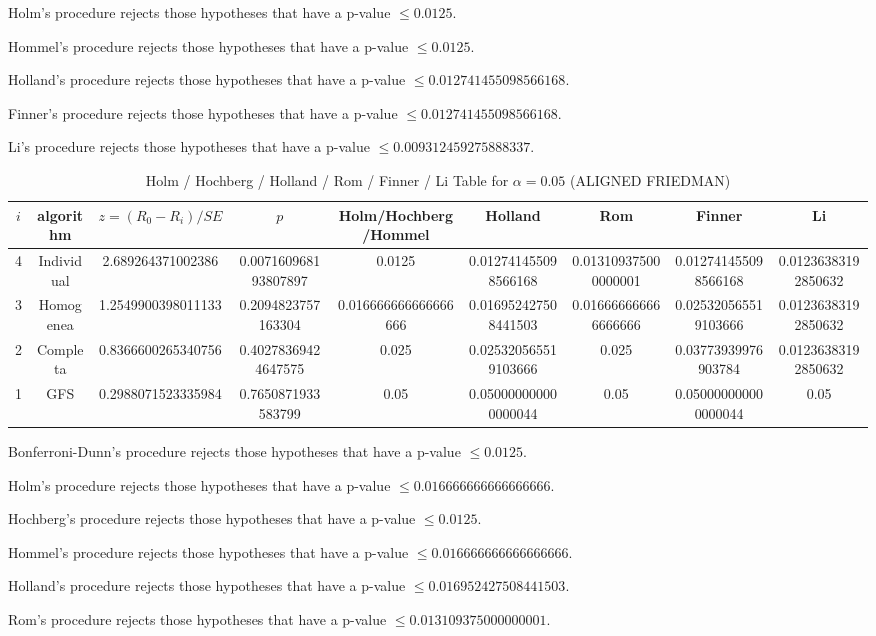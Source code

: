 \documentclass[a4paper,10pt]{article}
\begin{document}
\begin{landscape}
Holm's procedure rejects those hypotheses that have a p-value $\le0.0125$.


Hommel's procedure rejects those hypotheses that have a p-value $\le0.0125$.


Holland's procedure rejects those hypotheses that have a p-value $\le0.012741455098566168$.


Finner's procedure rejects those hypotheses that have a p-value $\le0.012741455098566168$.


Li's procedure rejects those hypotheses that have a p-value $\le0.009312459275888337$.



\newpage

\begin{table}[!htp]
\centering\scriptsize
\caption{Holm / Hochberg / Holland / Rom / Finner / Li Table for $\alpha=0.05$ (ALIGNED FRIEDMAN)}
\begin{tabular}{ccccccccc}
$i$&algorithm&$z=(R_0 - R_i)/SE$&$p$&Holm/Hochberg/Hommel&Holland&Rom&Finner&Li\\
\hline
4&Individual&2.689264371002386&0.007160968193807897&0.0125&0.012741455098566168&0.013109375000000001&0.012741455098566168&0.01236383192850632\\
3&Homogenea&1.2549900398011133&0.2094823757163304&0.016666666666666666&0.016952427508441503&0.016666666666666666&0.025320565519103666&0.01236383192850632\\
2&Completa&0.8366600265340756&0.40278369424647575&0.025&0.025320565519103666&0.025&0.03773939976903784&0.01236383192850632\\
1&GFS&0.2988071523335984&0.7650871933583799&0.05&0.050000000000000044&0.05&0.050000000000000044&0.05\\
\hline
\end{tabular}
\end{table}
Bonferroni-Dunn's procedure rejects those hypotheses that have a p-value $\le0.0125$.


Holm's procedure rejects those hypotheses that have a p-value $\le0.016666666666666666$.


Hochberg's procedure rejects those hypotheses that have a p-value $\le0.0125$.


Hommel's procedure rejects those hypotheses that have a p-value $\le0.016666666666666666$.


Holland's procedure rejects those hypotheses that have a p-value $\le0.016952427508441503$.


Rom's procedure rejects those hypotheses that have a p-value $\le0.013109375000000001$.



\end{landscape}
\end{document}
